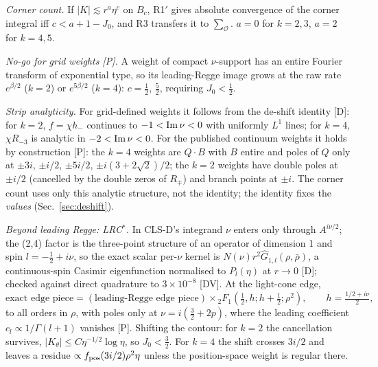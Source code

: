\documentclass[aps,prl,onecolumn,superscriptaddress,nofootinbib]{revtex4-2}
\begin{document}
\emph{Corner count.} If $|K|\lesssim r^a\eta^c$ on $B_c$, R1$'$ gives absolute convergence of the
corner integral iff $c<a+1-J_0$, and R3 transfers it to $\sum_{\mathcal O}$. $a=0$ for $k=2,3$,
$a=2$ for $k=4,5$.

\emph{No-go for grid weights [P].} A weight of compact $\nu$-support has an entire Fourier transform
of exponential type, so its leading-Regge image grows at the raw rate $e^{\beta/2}$ ($k=2$) or
$e^{5\beta/2}$ ($k=4$): $c=\tfrac12$, $\tfrac52$, requiring $J_0<\tfrac12$.

\emph{Strip analyticity.} For grid-defined weights it follows from the de-shift identity [D]: for $k=2$,
$f=\chi h_-$ continues to $-1<{\rm Im}\,\nu<0$ with uniformly $L^1$ lines; for $k=4$, $\chi R_{-3}$ is
analytic in $-2<{\rm Im}\,\nu<0$. For the published continuum weights it holds by construction [P]: the
$k=4$ weights are $Q\cdot B$ with $B$ entire and poles of $Q$ only at $\pm3i$, $\pm i/2$, $\pm5i/2$,
$\pm i(3+2\sqrt2)/2$; the $k=2$ weights have double poles at $\pm i/2$ (cancelled by the double zeros of
$R_\mp$) and branch points at $\pm i$. The corner count uses only this analytic structure, not the
identity; the identity fixes the \emph{values} (Sec.~\ref{sec:deshift}).

\emph{Beyond leading Regge: LRC$^*$.} In CLS-D's integrand $\nu$ enters only through $A^{i\nu/2}$; the
(2,4) factor is the three-point structure of an operator of dimension 1 and spin $l=-\tfrac12+i\nu$,
so the exact scalar per-$\nu$ kernel is $N(\nu)r^2\hat G_{1,l}(\rho,\bar\rho)$, a continuous-spin Casimir
eigenfunction normalised to $P_l(\eta)$ at $r\to0$ [D]; checked against direct quadrature to $3\times10^{-8}$
[DV]. At the light-cone edge,
\begin{equation}
\text{exact edge piece}=(\text{leading-Regge edge piece})\times{}_2F_1(\tfrac12,h;h+\tfrac12;\rho^2),
\qquad h=\tfrac{1/2+i\nu}{2},
\end{equation}
to all orders in $\rho$, with poles only at $\nu=i(\tfrac32+2p)$, where the leading coefficient
$c_l\propto1/\Gamma(l+1)$ vanishes [P]. Shifting the contour: for $k=2$ the cancellation survives,
$|K_\theta|\le C\eta^{-1/2}\log\eta$, so $J_0<\tfrac32$. For $k=4$ the shift crosses $3i/2$ and leaves a
residue $\propto f_{\rm pos}(3i/2)\rho^2\eta$ unless the position-space weight is regular there.
\end{document}
